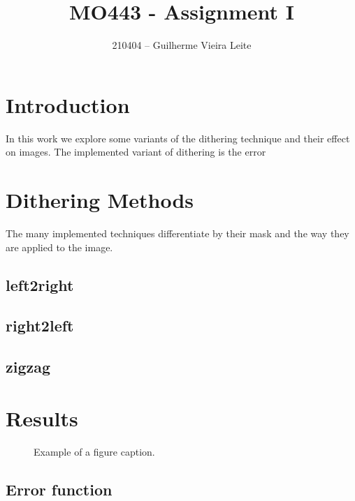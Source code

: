 \documentclass[conference]{IEEEtran}
\begin{document}
\title{MO443 - Assignment I}

\author{210404 -- Guilherme Vieira Leite}

\maketitle

\section{Introduction}

In this work we explore some variants of the dithering technique and their effect on images. The implemented variant of dithering is the error

\section{Dithering Methods}

The many implemented techniques differentiate by their mask and the way they are applied to the image.

\subsection{left2right}
\subsection{right2left}
\subsection{zigzag}

\section{Results}

\begin{figure}[htbp]
\centerline{%
		\setlength{\fboxsep}{1pt}%
		\setlength{\fboxrule}{1pt}%
	}%
    \caption{Example of a figure caption.}
    \label{fig}
\end{figure}

\subsection{Error function}
\end{document}
